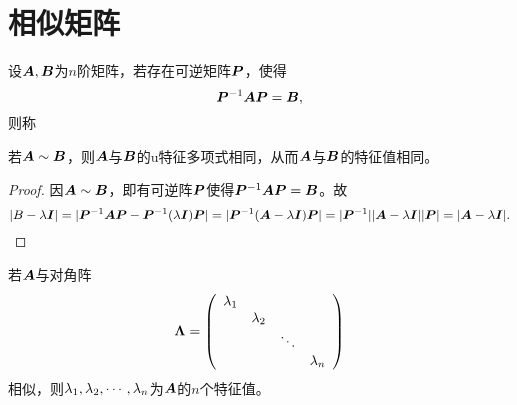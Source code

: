 \section{相似矩阵}

\begin{dingyi}
  设$\A,\B$为$n$阶矩阵，若存在可逆矩阵$\PP$，使得
  $$
  \PP^{-1}\A\PP=\B,
  $$
  则称
\end{dingyi}

\begin{dingli}
若$\A\sim \B$，则$\A$与$\B$的u特征多项式相同，从而$\A$与$\B$的特征值相同。
\end{dingli}
\begin{proof}
  因$\A\sim\B$，即有可逆阵$\PP$使得$\PP^{-1}\A\PP=\B$。故
  $$
  |B-\lambda \II|=|\PP^{-1}\A\PP-\PP^{-1}(\lambda \II)\PP|=|\PP^{-1}(\A-\lambda \II)\PP|=|\PP^{-1}||\A-\lambda \II||\PP|=|\A-\lambda \II|.
  $$
\end{proof}

\begin{tuilun}
  若$\A$与对角阵
  $$
  \Lambdabd=\left(
    \begin{array}{cccc}
      \lambda_1&&&\\
               &\lambda_2&&\\
               &&\dd&\\
               &&&\lambda_n
    \end{array}
  \right)
  $$
  相似，则$\lambda_1,\lambda_2,\cd,\lambda_n$为$\A$的$n$个特征值。
\end{tuilun}



